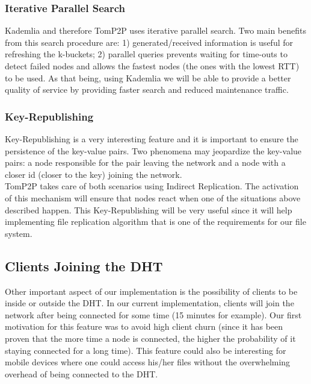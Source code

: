 \documentclass[times,9pt,article]{llncs}
\begin{document}
\subsubsection{Iterative Parallel Search}
Kademlia and therefore TomP2P uses iterative parallel search. Two main benefits from this search procedure are: 1) generated/received information is useful for  refreshing the k-buckets; 2) parallel queries prevents waiting for time-outs to  detect failed nodes and allows the fastest nodes (the ones with the lowest RTT)  to be used. As that being, using Kademlia we will be able to provide a better  quality of service by providing faster search and reduced maintenance traffic.

\subsubsection{Key-Republishing}
Key-Republishing is a very interesting feature and it is important to ensure the  persistence of the key-value pairs. Two phenomena may jeopardize the key-value pairs: a node responsible for the pair leaving the network and a node with a closer id (closer to the key) joining the network. \\
TomP2P takes care of both scenarios using Indirect Replication. The activation of this mechanism will ensure that nodes react when one of the situations above described happen. This Key-Republishing will be very useful since it will help implementing file replication algorithm that is one of the requirements for our file system.

\subsection{Clients Joining the DHT}
Other important aspect of our implementation is the possibility of clients to be inside or outside the DHT. In our current implementation, clients will join the network after being connected for some time (15 minutes for example). Our first motivation for this feature was to avoid high client churn (since it has been proven that the more time a node is connected, the higher the probability of it staying connected for a long time). This feature could also be interesting for mobile devices where one could access his/her files without the overwhelming overhead of being connected to the DHT.
\end{document}
